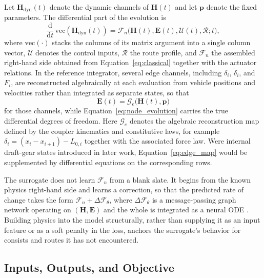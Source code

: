 \documentclass[numbered]{trbunofficial}
\begin{document}
Let $\mathbf{H}_{\mathrm{dyn}}(t)$ denote the dynamic channels of $\mathbf{H}(t)$ and let $\mathbf{p}$ denote the fixed parameters. The differential part of the evolution is
\begin{equation}
  \frac{\mathrm{d}}{\mathrm{d}t}\,\mathrm{vec}\!\left(\mathbf{H}_{\mathrm{dyn}}(t)\right) = \mathcal{F}_n\bigl(\mathbf{H}(t), \mathbf{E}(t), \mathcal{U}(t), \mathcal{R}; t\bigr),
  \label{eq:node_evolution}
\end{equation}
where $\mathrm{vec}(\cdot)$ stacks the columns of its matrix argument into a single column vector, $\mathcal{U}$ denotes the control inputs, $\mathcal{R}$ the route profile, and $\mathcal{F}_n$ the assembled right-hand side obtained from Equation~\ref{eq:classical} together with the actuator relations. In the reference integrator, several edge channels, including $\delta_i$, $\dot{\delta}_i$, and $F_i$, are reconstructed algebraically at each evaluation from vehicle positions and velocities rather than integrated as separate states, so that
\begin{equation}
  \mathbf{E}(t) = \mathcal{G}_e\bigl(\mathbf{H}(t), \mathbf{p}\bigr)
  \label{eq:edge_map}
\end{equation}
for those channels, while Equation~\ref{eq:node_evolution} carries the true differential degrees of freedom. Here $\mathcal{G}_e$ denotes the algebraic reconstruction map defined by the coupler kinematics and constitutive laws, for example $\delta_i = (x_i - x_{i+1}) - L_{0,i}$ together with the associated force law. Were internal draft-gear states introduced in later work, Equation~\ref{eq:edge_map} would be supplemented by differential equations on the corresponding rows.

The surrogate does not learn $\mathcal{F}_n$ from a blank slate. It begins from the known physics right-hand side and learns a correction, so that the predicted rate of change takes the form $\mathcal{F}_n + \Delta\mathcal{F}_\theta$, where $\Delta\mathcal{F}_\theta$ is a message-passing graph network operating on $(\mathbf{H}, \mathbf{E})$ and the whole is integrated as a neural ODE \citep{chen2018neuralode}. Building physics into the model structurally, rather than supplying it as an input feature or as a soft penalty in the loss, anchors the surrogate's behavior for consists and routes it has not encountered.

\subsection{Inputs, Outputs, and Objective}
\end{document}
